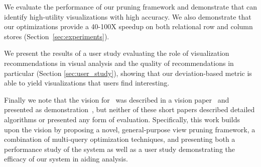 \begin{denselist}
  \item We evaluate the performance of our pruning framework and demonstrate that \SeeDB
  can identify high-utility visualizations with high accuracy. We also demonstrate that 
  our optimizations provide a 40-100X speedup on both relational row and column stores
  (Section~\ref{sec:experiments}). 
  \item We present the results of a user study evaluating the role of visualization 
  recommendations in visual analysis and the quality of \SeeDB recommendations in particular
  (Section \ref{sec:user_study}), showing that our deviation-based metric is able to yield visualizations that users find interesting.
\end{denselist}

\noindent Finally we note that the vision for \SeeDB\ was described in a vision paper~\cite{DBLP:conf/vldb/Parameswaran2013} and presented as demonstration~\cite{DBLP:journals/pvldb/VartakMPP14}, but neither of these short papers described detailed algorithms or
presented any form of evaluation.
Specifically, this work builds upon the \SeeDB vision by proposing a novel, general-purpose view 
pruning framework, a combination of multi-query optimization techniques, and presenting 
both a performance study of the system as well as a user study demonstrating the efficacy of our system in aiding analysis.



